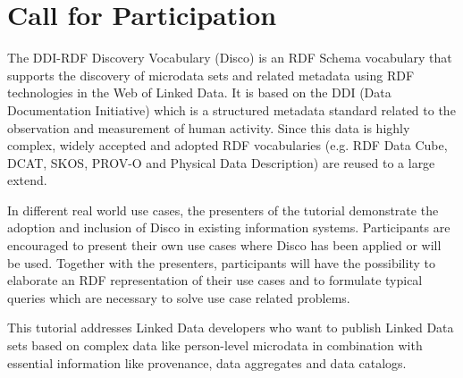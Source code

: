 \documentclass{llncs}
\begin{document}
%

\section{Call for Participation}
The DDI-RDF Discovery Vocabulary (Disco) is an RDF Schema vocabulary that supports the discovery of microdata sets and related metadata using RDF technologies in the Web of Linked Data. 
It is based on the DDI (Data Documentation Initiative) which is a structured metadata standard related to the observation and measurement of human activity.
Since this data is highly complex, widely accepted and adopted RDF vocabularies (e.g. RDF Data Cube, DCAT, SKOS, PROV-O and Physical Data Description) are reused to a large extend.

In different real world use cases, the presenters of the tutorial demonstrate the adoption and inclusion of Disco in existing information systems.
Participants are encouraged to present their own use cases where Disco has been applied or will be used. 
Together with the presenters, participants will have the possibility to elaborate an RDF representation of their use cases and to formulate typical queries which are necessary to solve use case related problems.

This tutorial addresses Linked Data developers who want to publish Linked Data sets based on complex data like person-level microdata in combination with essential information like provenance, data aggregates and data catalogs.
\end{document}
